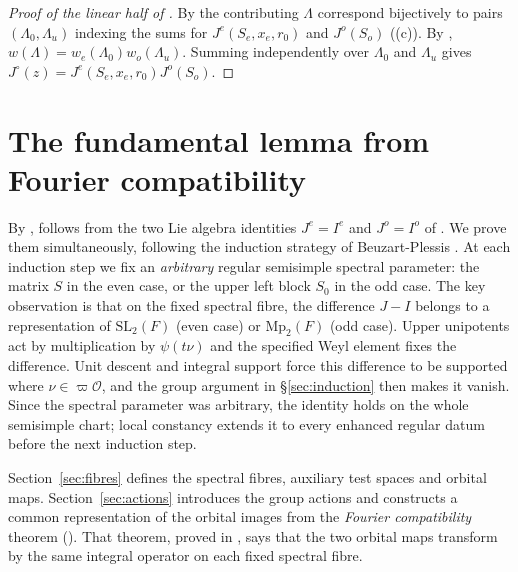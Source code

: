 \documentclass[11pt,oneside,notitlepage]{book}
\numberwithin{equation}{section}
\theoremstyle{plain}
\theoremstyle{definition}
\newtheorem{remark}[theorem]{Remark}
\newcommand{\cO}{\mathcal{O}}
\newcommand{\SL}{\mathrm{SL}}
\newcommand{\Mp}{\mathrm{Mp}}
\newcommand{\diag}{\operatorname{diag}}
\begin{document}
\begin{proof}[Proof of the linear half of ]
By  the contributing $\Lambda$ correspond bijectively to pairs $(\Lambda_0,\Lambda_u)$ indexing the sums for $J^e(S_e,x_e,r_0)$ and $J^o(S_o)$ ((c)). By , $w(\Lambda)=w_e(\Lambda_0)w_o(\Lambda_u)$. Summing independently over $\Lambda_0$ and $\Lambda_u$ gives $J^\circ(z)=J^e(S_e,x_e,r_0)J^o(S_o)$.
\end{proof}


\chapter{The fundamental lemma from Fourier compatibility}\label{ch:induction}

By ,  follows from the two Lie algebra identities $J^e=I^e$ and $J^o=I^o$ of . We prove them simultaneously, following the induction strategy of Beuzart-Plessis \cite{BP}. At each induction step we fix an \emph{arbitrary} regular semisimple spectral parameter: the matrix $S$ in the even case, or the upper left block $S_0$ in the odd case.  
The key observation is that on the fixed spectral fibre, the difference $J-I$ belongs to a representation of $\SL_2(F)$ (even case) or $\Mp_2(F)$ (odd case). Upper unipotents act by multiplication by $\psi(t\nu)$ and the specified Weyl element fixes the difference. Unit descent and integral support force this difference to be supported where $\nu\in\varpi\cO$, and the group argument in \S\ref{sec:induction} then makes it vanish. Since the spectral parameter was arbitrary, the identity holds on the whole semisimple chart; local constancy extends it to every enhanced regular datum before the next induction step.

Section~\ref{sec:fibres} defines the spectral fibres, auxiliary test spaces and orbital maps. Section~\ref{sec:actions} introduces the group actions and constructs a common representation of the orbital images from the \emph{Fourier compatibility} theorem (). That theorem, proved in , says that the two orbital maps transform by the same integral operator on each fixed spectral fibre.
\end{document}
